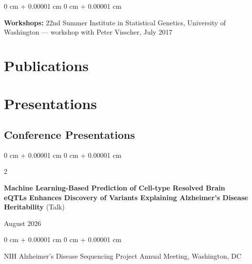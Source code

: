 \documentclass[10pt, letterpaper]{article}
\newenvironment{onecolentry}{
    \begin{adjustwidth}{
        0 cm + 0.00001 cm
    }{
        0 cm + 0.00001 cm
    }
}{
    \end{adjustwidth}
} %
\newenvironment{twocolentry}[2][]{
    \onecolentry
    \def\secondColumn{#2}
    \setcolumnwidth{\fill, 4.5 cm}
    \begin{paracol}{2}
}{
    \switchcolumn \raggedleft \secondColumn
    \end{paracol}
    \endonecolentry
} %
\begin{document}
        \vspace{0.10 cm}

        \begin{onecolentry}
            \textbf{Workshops:} 22nd Summer Institute in Statistical Genetics, University of Washington --- workshop with Peter Visscher, July 2017
        \end{onecolentry}





\section{Publications}
     \nocite{*} %
\printbibliography[keyword=preprint,heading=subbibliography,title={Preprints}]
\printbibliography[keyword=published,heading=subbibliography,title={Peer-Reviewed Publications}]
\printbibliography[keyword=earlier,heading=subbibliography,title={Earlier Work (Doctoral Training)}]



\section{Presentations}

\subsection{Conference Presentations}

    \begin{samepage}
        \begin{twocolentry}{
            August 2026
        }
            \textbf{Machine Learning-Based Prediction of Cell-type Resolved Brain eQTLs Enhances Discovery of Variants Explaining Alzheimer's Disease Heritability} (Talk)
        \end{twocolentry}

        \vspace{0.10 cm}

        \begin{onecolentry}
            NIH Alzheimer's Disease Sequencing Project Annual Meeting, Washington, DC
        \end{onecolentry}
    \end{samepage}

    \vspace{0.20 cm}
\end{document}
